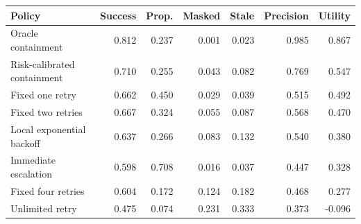 \begin{tabular}{lrrrrrr}
\toprule
Policy & Success & Prop. & Masked & Stale & Precision & Utility \\
\midrule
Oracle containment & 0.812 & 0.237 & 0.001 & 0.023 & 0.985 & 0.867 \\
Risk-calibrated containment & 0.710 & 0.255 & 0.043 & 0.082 & 0.769 & 0.547 \\
Fixed one retry & 0.662 & 0.450 & 0.029 & 0.039 & 0.515 & 0.492 \\
Fixed two retries & 0.667 & 0.324 & 0.055 & 0.087 & 0.568 & 0.470 \\
Local exponential backoff & 0.637 & 0.266 & 0.083 & 0.132 & 0.540 & 0.380 \\
Immediate escalation & 0.598 & 0.708 & 0.016 & 0.037 & 0.447 & 0.328 \\
Fixed four retries & 0.604 & 0.172 & 0.124 & 0.182 & 0.468 & 0.277 \\
Unlimited retry & 0.475 & 0.074 & 0.231 & 0.333 & 0.373 & -0.096 \\
\bottomrule
\end{tabular}
